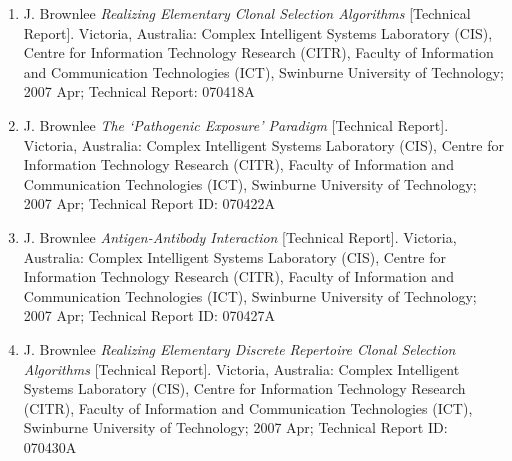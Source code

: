 \begin{enumerate}
	\item J. Brownlee \emph{Realizing Elementary Clonal Selection Algorithms} [Technical Report]. Victoria, Australia: Complex Intelligent Systems Laboratory (CIS), Centre for Information Technology Research (CITR), Faculty of Information and Communication Technologies (ICT), Swinburne University of Technology; 2007 Apr; Technical Report: 070418A
	\item J. Brownlee \emph{The `Pathogenic Exposure' Paradigm} [Technical Report]. Victoria, Australia: Complex Intelligent Systems Laboratory (CIS), Centre for Information Technology Research (CITR), Faculty of Information and Communication Technologies (ICT), Swinburne University of Technology; 2007 Apr; Technical Report ID: 070422A
	\item J. Brownlee \emph{Antigen-Antibody Interaction} [Technical Report]. Victoria, Australia: Complex Intelligent Systems Laboratory (CIS), Centre for Information Technology Research (CITR), Faculty of Information and Communication Technologies (ICT), Swinburne University of Technology; 2007 Apr; Technical Report ID: 070427A	
	\item J. Brownlee \emph{Realizing Elementary Discrete Repertoire Clonal Selection Algorithms} [Technical Report]. Victoria, Australia: Complex Intelligent Systems Laboratory (CIS), Centre for Information Technology Research (CITR), Faculty of Information and Communication Technologies (ICT), Swinburne University of Technology; 2007 Apr; Technical Report ID: 070430A
	

\end{enumerate}
